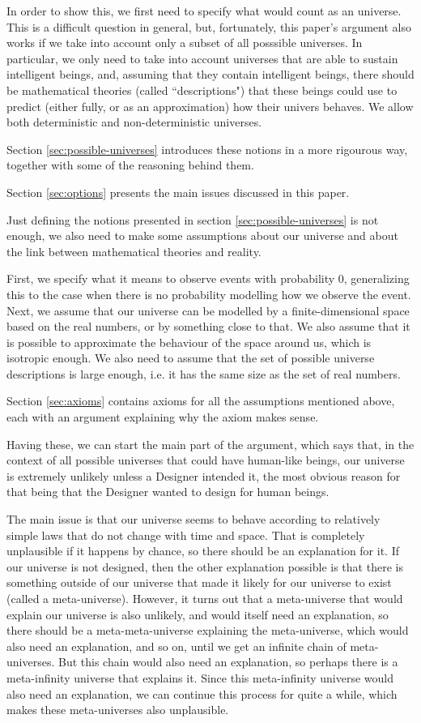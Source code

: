 \documentclass[a4paper
,draft
]{article}
\newcommand{\ghilimele}[1]{``#1"}
\begin{document}
In order to show this, we first need to specify what would count as an universe.
This is a difficult question in general, but, fortunately, this paper's argument
also works if we take into account only a subset of all posssible universes.
In particular, we only need to take into account universes that are able
to sustain intelligent beings,
and, assuming that they contain intelligent beings, there should be mathematical
theories (called \ghilimele{descriptions}) that these beings could use to
predict (either fully, or as an approximation) how their univers behaves.
We allow both deterministic and non-deterministic universes.

Section \ref{sec:possible-universes} introduces these notions in a more
rigourous way, together with some of the reasoning behind them.

Section \ref{sec:options} presents
the main issues discussed in this paper.

Just defining the notions presented in section \ref{sec:possible-universes}
is not enough,
we also need to make some assumptions about our universe and about
the link between mathematical theories and reality.

First, we specify what it means to observe events with probability $0$,
generalizing this to the case when there is no probability
modelling how we observe the event.
Next, we assume that our universe can be modelled by a finite-dimensional
space based on the real numbers, or by something close to that.
We also assume that it is possible to approximate the behaviour of the space
around us, which is isotropic enough.
We also need to assume that the set of possible universe descriptions
is large enough, i.e. it has the same size as the set of real numbers.

Section \ref{sec:axioms} contains axioms for all the assumptions mentioned
above, each with an argument explaining why the axiom makes sense.

Having these, we can start the main part of the argument,
which says that, in the context of all possible universes that could
have human-like beings, our universe is extremely unlikely unless a Designer
intended it, the most obvious reason for that being that the Designer wanted
to design for human beings.

The main issue is that our universe seems to behave according to relatively
simple laws that do not change with time and space.
That is completely
unplausible if it happens by chance, so there should be an explanation for it.
If our universe is not designed, then the other explanation possible is that
there is something outside of our universe that made it likely for our universe
to exist (called a meta-universe).
However, it turns out that a meta-universe that
would explain our universe is also unlikely, and would itself need an
explanation, so there should be a meta-meta-universe explaining the
meta-universe, which would also need an
explanation, and so on, until we get an infinite chain of meta-universes.
But this chain would also need an explanation, so perhaps there is a
meta-infinity universe that explains it.
Since this meta-infinity universe would also need an explanation, we can
continue this process for quite a while,
which makes these meta-universes also unplausible.
\end{document}
